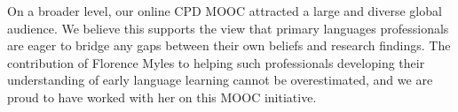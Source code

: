 \documentclass[output=paper]{langscibook}
\begin{document}
On a broader level, our online CPD MOOC attracted a large and diverse global audience. We believe this supports the view that primary languages professionals are eager to bridge any gaps between their own beliefs and research findings. The contribution of Florence Myles to helping such professionals developing their understanding of early language learning cannot be overestimated, and we are proud to have worked with her on this MOOC initiative.



\label{app:porter:b}
\end{document}
